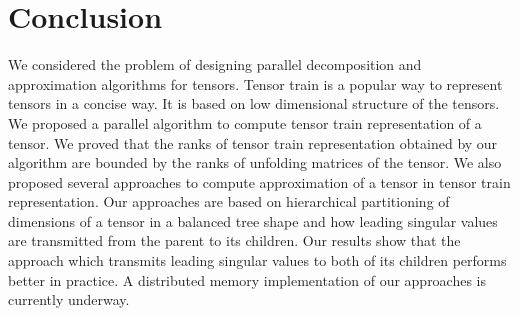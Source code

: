\documentclass[runningheads]{llncs}
\begin{document}

\section{Conclusion}
\label{sec:conclusion}
We considered the problem of designing parallel decomposition and approximation algorithms for tensors. Tensor train is a popular way to represent tensors in a concise way. It is based on low dimensional structure of the tensors. We proposed a parallel algorithm to compute tensor train representation of a tensor. We proved that the ranks of tensor train representation obtained by our algorithm are bounded by the ranks of unfolding matrices of the tensor. We also proposed several approaches to compute approximation of a tensor in tensor train representation. Our approaches are based on hierarchical partitioning of dimensions of a tensor in a balanced tree shape and how leading singular values are transmitted from the parent to its children. Our results show that the approach which transmits leading singular values to both of its children performs better in practice. A distributed memory implementation of our approaches is currently underway.
\end{document}
